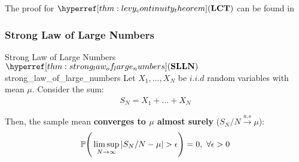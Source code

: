 \begin{proof*}
    The proof for $\LCT$ can be found in \cite[Section 9.1, Theorem 9.1 and Collorary 9.1]{book:allen2004}
\end{proof*}

\subsubsection{Strong Law of Large Numbers}
\begin{theorem}{Strong Law of Large Numbers $\SLLN$}{strong_law_of_large_numbers}
    Let $X_1, \dots, X_N$ be $i.i.d$ random variables with mean $\mu$. Consider the sum:
    \begin{align*}
        S_N = X_1 + \dots + X_N
    \end{align*}

    \noindent Then, the sample mean \textbf{converges to $\mu$ almost surely} ($S_N/N\xrightarrow{a.s}\mu$):
    \begin{align}
        \mathbb{P}\Bigg( 
            \limsup_{N\to\infty}|S_N/N - \mu| > \epsilon
         \Bigg) = 0, \ \forall \epsilon > 0
    \end{align}
\end{theorem}

